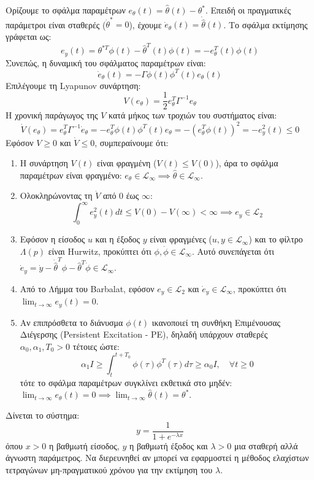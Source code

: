 \documentclass[a4paper,11pt]{article}
\begin{document}
\begin{answer}
Ορίζουμε το σφάλμα παραμέτρων $e_\theta(t) = \hat{\theta}(t) - \theta^*$. Επειδή οι πραγματικές παράμετροι είναι σταθερές ($\dot{\theta}^* = 0$), έχουμε $\dot{e}_\theta(t) = \dot{\hat{\theta}}(t)$.
Το σφάλμα εκτίμησης γράφεται ως:
\[ e_y(t) = \theta^{*T} \phi(t) - \hat{\theta}^T(t) \phi(t) = -e_\theta^T(t) \phi(t) \]
Συνεπώς, η δυναμική του σφάλματος παραμέτρων είναι:
\[ \dot{e}_\theta(t) = -\Gamma \phi(t) \phi^T(t) e_\theta(t) \]
Επιλέγουμε τη Lyapunov συνάρτηση:
\[ V(e_\theta) = \frac{1}{2} e_\theta^T \Gamma^{-1} e_\theta \]
Η χρονική παράγωγος της $V$ κατά μήκος των τροχιών του συστήματος είναι:
\[ \dot{V}(e_\theta) = e_\theta^T \Gamma^{-1} \dot{e}_\theta = -e_\theta^T \phi(t) \phi^T(t) e_\theta = -(e_\theta^T \phi(t))^2 = -e_y^2(t) \le 0 \]
Εφόσον $V \ge 0$ και $\dot{V} \le 0$, συμπεραίνουμε ότι:
\begin{enumerate}
    \item Η συνάρτηση $V(t)$ είναι φραγμένη ($V(t) \le V(0)$), άρα το σφάλμα παραμέτρων είναι φραγμένο: $e_\theta \in \mathcal{L}_\infty \implies \hat{\theta} \in \mathcal{L}_\infty$.
    \item Ολοκληρώνοντας τη $\dot{V}$ από $0$ έως $\infty$:
    \[ \int_0^\infty e_y^2(t) dt \le V(0) - V(\infty) < \infty \implies e_y \in \mathcal{L}_2 \]
    \item Εφόσον η είσοδος $u$ και η έξοδος $y$ είναι φραγμένες ($u, y \in \mathcal{L}_\infty$) και το φίλτρο $\Lambda(p)$ είναι Hurwitz, προκύπτει ότι $\phi, \dot{\phi} \in \mathcal{L}_\infty$. Αυτό συνεπάγεται ότι $\dot{e}_y = \dot{y} - \dot{\hat{\theta}}^T \phi - \hat{\theta}^T \dot{\phi} \in \mathcal{L}_\infty$.
    \item Από το Λήμμα του Barbalat, εφόσον $e_y \in \mathcal{L}_2$ και $\dot{e}_y \in \mathcal{L}_\infty$, προκύπτει ότι $\lim_{t \to \infty} e_y(t) = 0$.
    \item Αν επιπρόσθετα το διάνυσμα $\phi(t)$ ικανοποιεί τη συνθήκη Επιμένουσας Διέγερσης (Persistent Excitation - PE), δηλαδή υπάρχουν σταθερές $\alpha_0, \alpha_1, T_0 > 0$ τέτοιες ώστε:
    \[ \alpha_1 I \ge \int_{t}^{t+T_0} \phi(\tau)\phi^T(\tau) d\tau \ge \alpha_0 I, \quad \forall t \ge 0 \]
    τότε το σφάλμα παραμέτρων συγκλίνει εκθετικά στο μηδέν: $\lim_{t \to \infty} e_\theta(t) = 0 \implies \lim_{t \to \infty} \hat{\theta}(t) = \theta^*$.
\end{enumerate}
\end{answer}

\begin{question}
Δίνεται το σύστημα:
\begin{equation}
    y = \frac{1}{1 + e^{-\lambda x}}
\end{equation}
όπου $x > 0$ η βαθμωτή είσοδος, $y$ η βαθμωτή έξοδος και $\lambda > 0$ μια σταθερή αλλά άγνωστη παράμετρος. Να διερευνηθεί αν μπορεί να εφαρμοστεί η μέθοδος ελαχίστων τετραγώνων μη-πραγματικού χρόνου για την εκτίμηση του $\lambda$.
\end{question}
\end{document}
